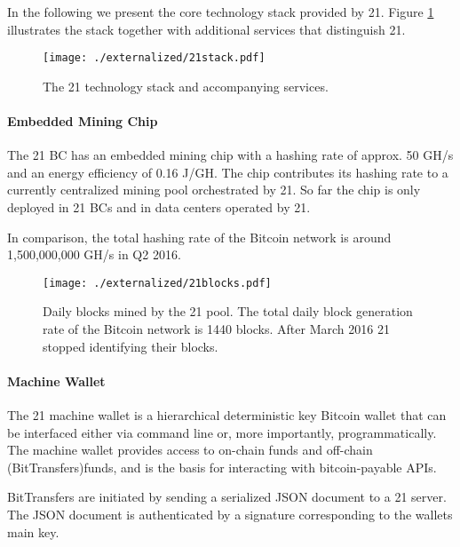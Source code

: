 In the following we present the core technology stack provided by 21. Figure \ref{fig:21stack} illustrates the stack together with additional services that distinguish 21.

\begin{figure}
\centering
\texttt{[image: ./externalized/21stack.pdf]}
\caption{The 21 technology stack and accompanying services.}
\label{fig:21stack}
\end{figure}

\paragraph{Embedded Mining Chip}

The 21 BC has an embedded mining chip with a hashing rate of approx. 50 GH/s and an energy efficiency of 0.16 J/GH. The chip contributes its hashing rate to a currently centralized mining pool orchestrated by 21. So far the chip is only deployed in 21 BCs and in data centers operated by 21.   

In comparison, the total hashing rate of the Bitcoin network is around 1,500,000,000 GH/s in Q2 2016.

\begin{figure}
\centering
\texttt{[image: ./externalized/21blocks.pdf]}
\caption{Daily blocks mined by the 21 pool. The total daily block generation rate of the Bitcoin network is 1440 blocks. After March 2016 21 stopped identifying their blocks.}
\label{fig:21blocks}
\end{figure} 

\paragraph{Machine Wallet}

The 21 machine wallet is a hierarchical deterministic key Bitcoin wallet that can be interfaced either via command line or, more importantly, programmatically. The machine wallet provides access to on-chain funds and off-chain (BitTransfers)funds, and is the basis for interacting with bitcoin-payable APIs. 

BitTransfers are initiated by sending a serialized JSON document to a 21 server. The JSON document is authenticated by a signature corresponding to the wallets main key. 

